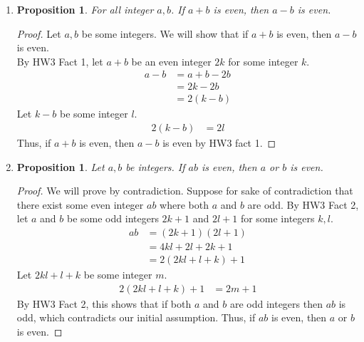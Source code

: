 \documentclass{article}
\newtheorem{prop}[thm]{Proposition}
\begin{document}
\begin{enumerate}
\item \begin{prop}
    For all integer $a, b$.  If $a + b$ is even, then $a - b$ is even.
\end{prop}
\begin{proof}
Let $a, b$ be some integers. We will show that if $a + b$ is even, then $a - b$ is even. \\
By HW3 Fact 1, let $a + b$ be an even integer $2k$ for some integer $k$.
\begin{align}
    a - b &= a + b - 2b \\ 
    &= 2k - 2b \\
    &= 2(k - b)
\end{align}
Let $k - b$ be some integer $l$.
\begin{align}
    2(k - b) &= 2l
\end{align}
Thus, if $a + b$ is even, then $a - b$ is even by HW3 fact 1.
\end{proof}

\item \begin{prop}
    Let $a, b$ be integers. If $ab$ is even, then $a$ or $b$ is even.
\end{prop}

\begin{proof}
We will prove by contradiction. Suppose for sake of contradiction that there exist some even integer $ab$ where both $a$ and $b$ are odd. By HW3 Fact 2, let $a$ and $b$ be some odd integers $2k + 1$ and $2l + 1$ for some integers $k, l$.
\begin{align}
    ab &= (2k + 1)(2l + 1) \\
    &= 4kl + 2l + 2k + 1 \\
    &= 2(2kl + l + k) + 1
\end{align}
Let $2kl + l + k$ be some integer $m$.
\begin{align}
    2(2kl + l + k) + 1 &= 2m + 1
\end{align}
By HW3 Fact 2, this shows that if both $a$ and $b$ are odd integers then $ab$ is odd, which contradicts our initial assumption. Thus, if $ab$ is even, then $a$ or $b$ is even.
\end{proof}
    
\end{enumerate}
\end{document}
